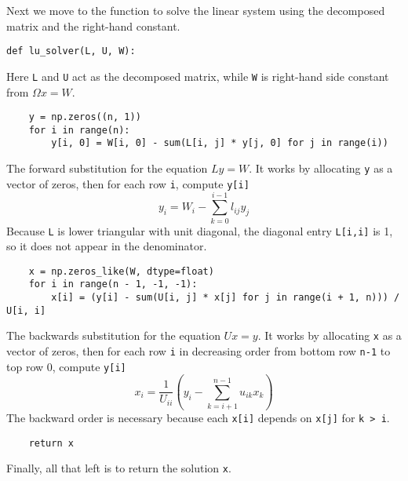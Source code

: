 \documentclass[../../../main.tex]{subfiles}
\begin{document}
Next we move to the function to solve the linear system using the decomposed matrix and the right-hand constant.
\begin{verbatim}
def lu_solver(L, U, W):
\end{verbatim}
Here \verb|L| and \verb|U| act as the decomposed matrix, while \verb|W| is right-hand side constant from $\Omega x=W$.
\begin{verbatim}
    y = np.zeros((n, 1))
    for i in range(n):
        y[i, 0] = W[i, 0] - sum(L[i, j] * y[j, 0] for j in range(i))
\end{verbatim}
The forward substitution for the equation $Ly=W$. 
It works by allocating \verb|y| as a vector of zeros, then for each row \verb|i|, compute \verb|y[i]|
\begin{equation*}
    y_i=W_i-\sum_{k=0 }^{i-1 }l_{ij}y_{j}
\end{equation*}
Because \verb|L| is lower triangular with unit diagonal, the diagonal entry \verb|L[i,i]| is 1, so it does not appear in the denominator.
\begin{verbatim}
    x = np.zeros_like(W, dtype=float)
    for i in range(n - 1, -1, -1):
        x[i] = (y[i] - sum(U[i, j] * x[j] for j in range(i + 1, n))) / U[i, i]
\end{verbatim}
The backwards substitution for the equation $Ux=y$. 
It works by allocating \verb|x| as a vector of zeros, then for each row \verb|i| in decreasing order from bottom row \verb|n-1| to top row 0, compute \verb|y[i]|
\begin{equation*}
    x_i=\frac{1 }{U_{ii}}\left( y_i-\sum_{k=i+1 }^{n-1 }u_{ik}x_{k} \right) 
\end{equation*}
The backward order is necessary because each \verb|x[i]| depends on \verb|x[j]| for \verb|k > i|.
\begin{verbatim}
    return x
\end{verbatim}
Finally, all that left is to return the solution \verb|x|.
\end{document}
